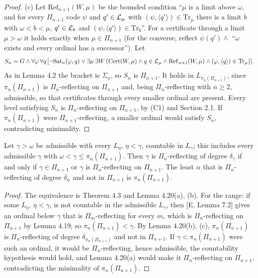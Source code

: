 \documentclass[11pt]{article}
\begin{document}
\begin{proof}
(c) Let $\mathrm{Ref}_{n+1}(W,\mu)$ be the bounded condition ``$\mu$ is a limit above $\omega$, and for every
$\Pi_{n+1}$ code $\psi$ and $q' \in \mathcal{L}_\mu$ with $(\psi, \langle q'\rangle) \in \mathrm{Tr}_\mu$ there is a limit $b$
with $\omega < b < \mu$, $q' \in \mathcal{L}_b$ and $(\psi, \langle q' \rangle) \in \mathrm{Tr}_b$''. For a certificate through a
limit $\mu > \omega$ it holds exactly when $\mu \in \Pi_{n+1}$ (for the converse, reflect $\psi(q') \wedge$ ``$\omega$ exists
and every ordinal has a successor''). Let
\[ S_n = G \wedge \forall\varphi\, \forall q\, [\neg\mathrm{Sat}_n(\varphi,q) \vee
\exists\mu\, \exists W\, (\mathrm{Cert}(W,\mu) \wedge q \in \mathcal{L}_\mu \wedge \mathrm{Ref}_{n+1}(W,\mu) \wedge (\varphi,\langle
q\rangle) \in \mathrm{Tr}_\mu)]. \] As in Lemma 4.2 the bracket is $\Sigma_n$, so $S_n$ is $\Pi_{n+1}$. It holds in
$L_{\pi_n(\Pi_{n+1})}$, since $\pi_n(\Pi_{n+1})$ is $\Pi_n$-reflecting on $\Pi_{n+1}$ and, being $\Pi_n$-reflecting with $n \ge 2$,
admissible, so that certificates through every smaller ordinal are present. Every level satisfying $S_n$ is
$\Pi_n$-reflecting on $\Pi_{n+1}$, by (C1) and Section 2.1. If $\pi_n(\Pi_{n+1})$ were $\Pi_{n+1}$-reflecting, a smaller ordinal
would satisfy $S_n$, contradicting minimality.
\end{proof}

\begin{statement} Let $\gamma > \omega$ be admissible with every
$L_\eta$, $\eta < \gamma$, countable in $L_\gamma$; this includes every admissible $\gamma$ with $\omega < \gamma \le
\pi_n(\Pi_{n+1})$. Then $\gamma$ is $\Pi_n$-reflecting of degree $\delta_\gamma$ if and only if $\gamma \in \Pi_{n+1}$ or
$\gamma$ is $\Pi_n$-reflecting on $\Pi_{n+1}$. The least $\alpha$ that is $\Pi_n$-reflecting of degree $\delta_\alpha$ and
not in $\Pi_{n+1}$ is $\pi_n(\Pi_{n+1})$.
\end{statement}

\begin{proof}
The equivalence is Theorem 4.3 and Lemma 4.20(a), (b). For the range: if some $L_\eta$, $\eta < \gamma$, is not
countable in the admissible $L_\gamma$, then [E, Lemma 7.2] gives an ordinal below $\gamma$ that is $\Pi_m$-reflecting
for every $m$, which is $\Pi_n$-reflecting on $\Pi_{n+1}$ by Lemma 4.19; so $\pi_n(\Pi_{n+1}) < \gamma$. By Lemma 4.20(b), (c),
$\pi_n(\Pi_{n+1})$ is $\Pi_n$-reflecting of degree $\delta_{\pi_n(\Pi_{n+1})}$ and not in $\Pi_{n+1}$. If $\gamma < \pi_n(\Pi_{n+1})$ were
such an ordinal, it would be $\Pi_n$-reflecting, hence admissible, the countability hypothesis would hold, and Lemma
4.20(a) would make it $\Pi_n$-reflecting on $\Pi_{n+1}$, contradicting the minimality of $\pi_n(\Pi_{n+1})$.
\end{proof}
\end{document}
